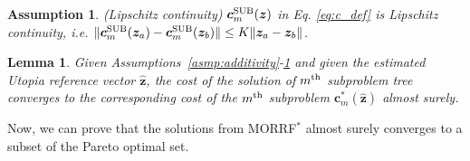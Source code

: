 \documentclass{article}
\newtheorem{lem}{Lemma}
\newtheorem{asmp}{Assumption}
\begin{document}
\begin{asmp}{(Lipschitz continuity)}
\label{asmp:lipschitz}
$ \bm{c}^{\rm SUB}_{m} ( \bm{z} )  $ in Eq. \eqref{eq:c_def} is Lipschitz continuity, i.e.
$ \lVert \bm{c}^{\rm SUB}_{m} ( \bm{z}_{a} ) - \bm{c}^{\rm SUB}_{m} ( \bm{z}_{b} ) \rVert \leq K \lVert \bm{z}_{a} - \bm{z}_{b} \rVert $.
\end{asmp}

\begin{lem}
\label{lem:sub_tree:conv}
Given Assumptions~\ref{asmp:additivity}-\ref{asmp:lipschitz} and given the estimated Utopia reference vector $ \hat{\bm{z}} $,
the cost of the solution of $ m^{\rm th} $ subproblem tree converges to the corresponding cost of the $ m^{\rm th} $ subproblem $ \bm{c}_{m}^{*} ( \hat{\bm{z}} ) $ almost surely.
\end{lem}

Now, we can prove that the solutions from MORRF$^{*}$ almost surely converges to a subset of the Pareto optimal set.
\end{document}
